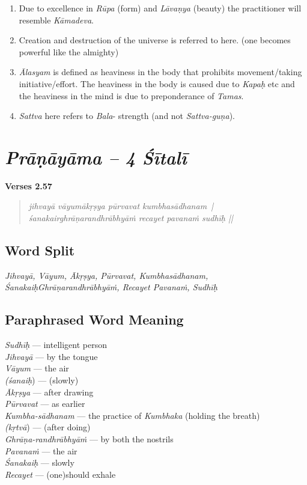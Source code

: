 \begin{enumerate}
\itemsep=0pt
\item Due to excellence in \textit{Rūpa} (form) and \textit{Lāvaṇya} (beauty) the practitioner  will resemble \textit{Kāmadeva}. 
\item Creation and destruction of the universe is referred to here. (one becomes powerful like the almighty)
\item \textit{Ālasyam} is defined as heaviness in the body that prohibits movement/taking initiative/effort. The heaviness in the body is caused due to \textit{Kapaḥ} etc and the heaviness in the mind is due to preponderance of \textit{Tamas}. 
\item \textit{Sattva} here refers to \textit{Bala}- strength (and not \textit{Sattva-guṇa}). 
\end{enumerate}

\section*{\textit{Prāṇāyāma -- 4 Śītalī}}

\noindent \textbf{Verses 2.57}

\begin{verse}
\textit{jihvayā vāyumākṛṣya pūrvavat kumbhasādhanam |\\
śanakairghrāṇarandhrābhyāṁ recayet pavanaṁ sudhīḥ ||}
\end{verse}

\subsection*{Word Split}

\textit{Jihvayā, Vāyum, Ākṛṣya, Pūrvavat, Kumbhasādhanam, Śanakaiḥ\break Ghrāṇarandhrābhyāṁ, Recayet Pavanaṁ, Sudhīḥ}

\subsection*{Paraphrased Word Meaning}
\vspace{-10pt}

\begin{multicols}{2}
\textit{Sudhīḥ} --- intelligent person \\
\textit{Jihvayā} --- by the tongue \\
\textit{Vāyum} --- the air \\
\textit{(śanaiḥ}) --- (slowly)\\
\textit{Ākṛṣya} --- after drawing \\
\textit{Pūrvavat} --- as earlier \\
\textit{Kumbha-sādhanam} --- the practice of \textit{Kumbhaka} (holding the breath)\\
\textit{(kṛtvā}) --- (after doing)\\
\textit{Ghrāṇa-randhrābhyāṁ} --- by both the nostrils \\
\textit{Pavanaṁ} --- the air \\
\textit{Śanakaiḥ} --- slowly \\
\textit{Recayet} --- (one)should exhale
\end{multicols}

